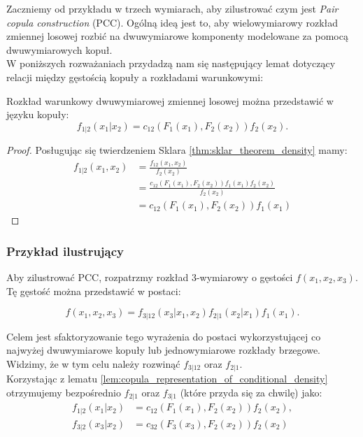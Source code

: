 Zaczniemy od przykładu w trzech wymiarach, aby zilustrować czym jest \emph{Pair copula construction} (PCC). Ogólną ideą jest to, aby wielowymiarowy rozkład zmiennej losowej rozbić na dwuwymiarowe komponenty modelowane za pomocą dwuwymiarowych kopuł.\\

W poniższych rozważaniach przydadzą nam się następujący lemat dotyczący relacji między gęstością kopuły a rozkładami warunkowymi:

\begin{lemma}
	Rozkład warunkowy dwuwymiarowej zmiennej losowej można przedstawić w języku kopuły:	
	$$ f_{1|2}(x_1|x_2) =c_{12}(F_1(x_1), F_2(x_2))f_2(x_2).$$
	\label{lem:copula_representation_of_conditional_density}
\end{lemma}
\begin{proof}
	Posługując się twierdzeniem Sklara \ref{thm:sklar_theorem_density} mamy:
	\begin{equation*}
		\begin{split}
			f_{1|2}(x_1, x_2) & = \frac{f_{12}(x_1, x_2)}{f_2(x_2)} \\
			& = \frac{c_{12}(F_1(x_1), F_2(x_2))f_1(x_1)f_2(x_2)}{f_2(x_2)}\\
			& = c_{12}(F_1(x_1), F_2(x_2))f_1(x_1)
		\end{split}
	\end{equation*}
\end{proof}

\subsubsection{Przykład ilustrujący}
\label{subsub:przyklad_3_wymiary}
Aby zilustrować PCC, rozpatrzmy rozkład $3$-wymiarowy o gęstości $f(x_1, x_2, x_3)$. Tę gęstość można przedstawić w postaci:

$$ f(x_1, x_2, x_3) = f_{3|12}(x_3|x_1, x_2)f_{2|1}(x_2|x_1)f_1(x_1).$$

Celem jest sfaktoryzowanie tego wyrażenia do postaci wykorzystującej co najwyżej dwuwymiarowe kopuły lub jednowymiarowe rozkłady brzegowe. Widzimy, że w tym celu należy rozwinąć $f_{3|12}$ oraz $f_{2|1}$. \\
Korzystając z lematu \ref{lem:copula_representation_of_conditional_density} otrzymujemy bezpośrednio $f_{2|1}$ oraz $f_{3|1}$ (które przyda się za chwilę) jako:
\begin{equation*}
	\begin{split}
		f_{1|2}(x_1|x_2) &= c_{12}(F_1(x_1), F_2(x_2))f_2(x_2),\\
		f_{3|2}(x_3|x_2) &= c_{32}(F_3(x_3), F_2(x_2))f_2(x_2)
	\end{split}
\end{equation*}

